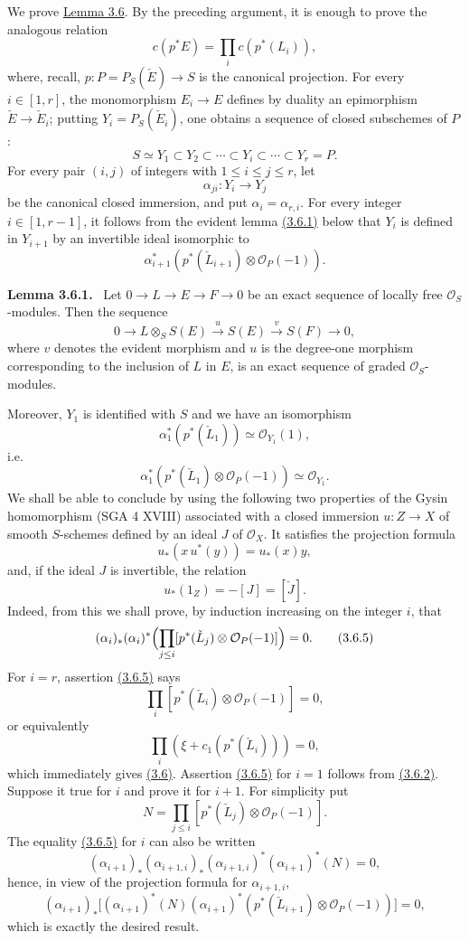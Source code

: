 \documentclass[11pt]{article}
\newenvironment{statement}[1]{\par\medskip\noindent\textbf{#1.}\ }{\par\medskip}
\begin{document}
We prove \hyperref[sga5:VII:lemma:3.6]{Lemma 3.6}. By the preceding argument, it is enough to prove the analogous relation
\[
c(p^*E)=\prod_i c(p^*(L_i)),
\]
where, recall, $p:P=P_S(\check E)\to S$ is the canonical projection. For every $i\in[1,r]$, the monomorphism $E_i\to E$ defines by duality an epimorphism $\check E\to\check E_i$; putting $Y_i=P_S(\check E_i)$, one obtains a sequence of closed subschemes of $P$:
\[
S\simeq Y_1\subset Y_2\subset\cdots\subset Y_i\subset\cdots\subset Y_r=P.
\]
For every pair $(i,j)$ of integers with $1\le i\le j\le r$, let
\[
\alpha_{ji}:Y_i\to Y_j
\]
be the canonical closed immersion, and put $\alpha_i=\alpha_{r,i}$. For every integer $i\in[1,r-1]$, it follows from the evident lemma \hyperref[sga5:VII:lemma:3.6.1]{(3.6.1)} below that $Y_i$ is defined in $Y_{i+1}$ by an invertible ideal isomorphic to
\[
\alpha_{i+1}^*(p^*(\check L_{i+1})\otimes\mathcal O_P(-1)).
\]

\label{sga5:VII:lemma:3.6.1}\begin{statement}{Lemma 3.6.1}
Let $0\to L\to E\to F\to0$ be an exact sequence of locally free $\mathcal O_S$-modules. Then the sequence
\[
0\to L\otimes_S S(E)\xrightarrow{u}S(E)\xrightarrow{v}S(F)\to0,
\]
where $v$ denotes the evident morphism and $u$ is the degree-one morphism corresponding to the inclusion of $L$ in $E$, is an exact sequence of graded $\mathcal O_S$-modules.
\end{statement}

Moreover, $Y_1$ is identified with $S$ and we have an isomorphism
\[
\alpha_1^*(p^*(\check L_1))\simeq\mathcal O_{Y_1}(1),
\]
i.e.
\[
\alpha_1^*(p^*(\check L_1)\otimes\mathcal O_P(-1))\simeq \mathcal O_{Y_1}.
\tag{3.6.2}\label{sga5:VII:equation:3.6.2}
\]
We shall be able to conclude by using the following two properties of the Gysin homomorphism (SGA 4 XVIII) associated with a closed immersion $u:Z\to X$ of smooth $S$-schemes defined by an ideal $J$ of $\mathcal O_X$. It satisfies the projection formula
\[
u_*(x\,u^*(y))=u_*(x)y,
\tag{3.6.3}\label{sga5:VII:equation:3.6.3}
\]
and, if the ideal $J$ is invertible, the relation
\[
u_*(1_Z)=-[J]=[\check J].
\tag{3.6.4}\label{sga5:VII:equation:3.6.4}
\]
Indeed, from this we shall prove, by induction increasing on the integer $i$, that
\[
(\alpha_i)_*(\alpha_i)^*\Bigl(\prod_{j\le i}[p^*(\check L_j)\otimes\mathcal O_P(-1)]\Bigr)=0.
\tag{3.6.5}\label{sga5:VII:equation:3.6.5}
\]
For $i=r$, assertion \hyperref[sga5:VII:equation:3.6.5]{(3.6.5)} says
\[
\prod_i[p^*(\check L_i)\otimes\mathcal O_P(-1)]=0,
\]
or equivalently
\[
\prod_i(\xi+c_1(p^*(\check L_i)))=0,
\]
which immediately gives \hyperref[sga5:VII:lemma:3.6]{(3.6)}. Assertion \hyperref[sga5:VII:equation:3.6.5]{(3.6.5)} for $i=1$ follows from \hyperref[sga5:VII:equation:3.6.2]{(3.6.2)}. Suppose it true for $i$ and prove it for $i+1$. For simplicity put
\[
N=\prod_{j\le i}[p^*(\check L_j)\otimes\mathcal O_P(-1)].
\]
The equality \hyperref[sga5:VII:equation:3.6.5]{(3.6.5)} for $i$ can also be written
\[
(\alpha_{i+1})_*(\alpha_{i+1,i})_*(\alpha_{i+1,i})^*(\alpha_{i+1})^*(N)=0,
\]
hence, in view of the projection formula for $\alpha_{i+1,i}$,
\[
(\alpha_{i+1})_*\bigl[(\alpha_{i+1})^*(N)(\alpha_{i+1})^*(p^*(\check L_{i+1})\otimes\mathcal O_P(-1))\bigr]=0,
\]
which is exactly the desired result.
\end{document}
